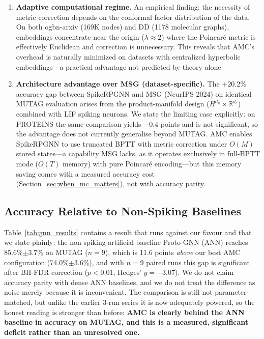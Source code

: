 \documentclass[a4paper,fleqn]{cas-dc}
\begin{document}
\begin{enumerate}
    \item \textbf{Adaptive computational regime.} An empirical finding: the necessity of metric correction depends on the conformal factor distribution of the data. On both ogbn-arxiv (169K nodes) and DD (1178 molecular graphs), embeddings concentrate near the origin ($\lambda{\approx}2$) where the Poincar\'e metric is effectively Euclidean and correction is unnecessary. This reveals that AMC's overhead is naturally minimized on datasets with centralized hyperbolic embeddings---a practical advantage not predicted by theory alone.
    
    \item \textbf{Architecture advantage over MSG (dataset-specific).} The $+20.2\%$ accuracy gap between SpikeRPGNN and MSG (NeurIPS 2024) on identical MUTAG evaluation arises from the product-manifold design ($H^{d_h}{\times}\mathbb{R}^{d_e}$) combined with LIF spiking neurons. We state the limiting case explicitly: on PROTEINS the same comparison yields $-0.4$ points and is not significant, so the advantage does not currently generalise beyond MUTAG. AMC enables SpikeRPGNN to use truncated BPTT with metric correction under $O(M)$ stored states---a capability MSG lacks, as it operates exclusively in full-BPTT mode ($O(T)$ memory) with pure Poincar\'e encoding---but this memory saving comes with a measured accuracy cost (Section~\ref{sec:when_mc_matters}), not with accuracy parity.
\end{enumerate}

\subsection{Accuracy Relative to Non-Spiking Baselines}

Table~\ref{tab:gnn_results} contains a result that runs against our favour and that we state plainly: the non-spiking artificial baseline Proto-GNN (ANN) reaches 85.6\%$\pm$3.7\% on MUTAG ($n{=}9$), which is 11.6 points \emph{above} our best AMC configuration (74.0\%$\pm$3.6\%), and with $n{=}9$ paired runs this gap is significant after BH-FDR correction ($p{<}0.01$, Hedges' $g=-3.07$). We do not claim accuracy parity with dense ANN baselines, and we do not treat the difference as noise merely because it is inconvenient. The comparison is still not parameter-matched, but unlike the earlier 3-run series it is now adequately powered, so the honest reading is stronger than before: \textbf{AMC is clearly behind the ANN baseline in accuracy on MUTAG, and this is a measured, significant deficit rather than an unresolved one.}
\end{document}
